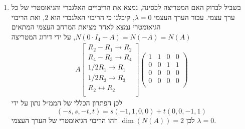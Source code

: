 \documentclass[12pt, a4paper]{article}
\begin{document}
\begin{enumerate}
\begin{enumerate}
\begin{align*}
\begin{pmatrix}
        \end{pmatrix}\\&
        \underset{\begin{bmatrix}
        R_2+2R_1\rightarrow R_2\\
        R_4+2R_3\rightarrow R_4\\
        \end{bmatrix}}{=}
           \det\begin{pmatrix}
            1&-1&0&0\\
            0&x-4&0&0\\
            0&0&1&-1\\
            0&0&0&x-4\\
        \end{pmatrix}=x^2(x-4)^2
    \end{align*}
    כאשר השלב האחרון נובע כי המטריצה היא משולשית עליונה ולכן הדטרמיננטה שווה למכפלת איברי האלכסון. מכך ניתן לראות כי הערכים העצמיים של
    $A$
    הם
    $\lambda=0,4$.
    
    \item 
    בשביל לבדוק האם המטריצה לכסינה, נמצא את הריבויים האלגברי והגיאומטרי של כל ערך עצמי. עבור הערך העצמי
    $\lambda=0$,
    קיבלנו כי הריבוי האלגברי הוא
    $2$,
    ואת הריבוי הגיאומטרי נמצא לאחר 
    מציאת המרחב העצמי המתאים
    $N(0\cdot I_4-A)=N(-A)=N(A)$,
    על ידי דירוג המטריצה
    \begin{align*}
     A
     \begin{bmatrix}
         R_2-R_1\rightarrow R_2\\
         R_4-R_3\rightarrow R_4\\
         1/2R_1\rightarrow R_1\\
         1/2R_3\rightarrow R_3\\
         R_2\leftrightarrow R_2\\
     \end{bmatrix}
     \begin{pmatrix}
         1&1&0&0\\
         0&0&1&1\\
         0&0&0&0\\
         0&0&0&0\\
     \end{pmatrix}
    \end{align*}
    לכן הפתרון הכללי של הממ״ל נתון על ידי
    $$ (-s , s,-t , t)=s(-1,1,0,0)+t(0,0,-1,1)$$
    לכן 
    $\dim(N(A))=2$
    וזהו הריבוי הגיאומטרי של הערך העצמי
    $\lambda=0$.


\end{enumerate}
\end{enumerate}
\end{document}
